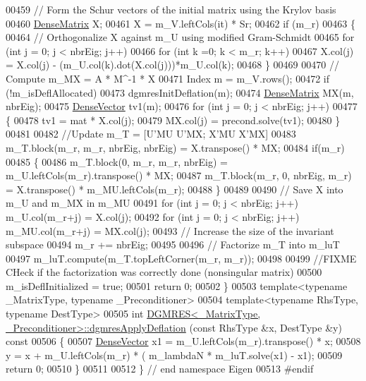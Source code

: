 \begin{DoxyCode}
00459   \textcolor{comment}{// Form the Schur vectors of the initial matrix using the Krylov basis}
00460   \hyperlink{group___core___module}{DenseMatrix} X; 
00461   X = m\_V.leftCols(it) * Sr;
00462   \textcolor{keywordflow}{if} (m\_r)
00463   \{
00464    \textcolor{comment}{// Orthogonalize X against m\_U using modified Gram-Schmidt}
00465    \textcolor{keywordflow}{for} (\textcolor{keywordtype}{int} j = 0; j < nbrEig; j++)
00466      \textcolor{keywordflow}{for} (\textcolor{keywordtype}{int} k =0; k < m\_r; k++)
00467       X.col(j) = X.col(j) - (m\_U.col(k).dot(X.col(j)))*m\_U.col(k); 
00468   \}
00469   
00470   \textcolor{comment}{// Compute m\_MX = A * M^-1 * X}
00471   Index m = m\_V.rows();
00472   \textcolor{keywordflow}{if} (!m\_isDeflAllocated) 
00473     dgmresInitDeflation(m); 
00474   \hyperlink{group___core___module}{DenseMatrix} MX(m, nbrEig);
00475   \hyperlink{group___core___module}{DenseVector} tv1(m);
00476   \textcolor{keywordflow}{for} (\textcolor{keywordtype}{int} j = 0; j < nbrEig; j++)
00477   \{
00478     tv1 = mat * X.col(j);
00479     MX.col(j) = precond.solve(tv1);
00480   \}
00481   
00482   \textcolor{comment}{//Update m\_T = [U'MU U'MX; X'MU X'MX]}
00483   m\_T.block(m\_r, m\_r, nbrEig, nbrEig) = X.transpose() * MX; 
00484   \textcolor{keywordflow}{if}(m\_r)
00485   \{
00486     m\_T.block(0, m\_r, m\_r, nbrEig) = m\_U.leftCols(m\_r).transpose() * MX; 
00487     m\_T.block(m\_r, 0, nbrEig, m\_r) = X.transpose() * m\_MU.leftCols(m\_r);
00488   \}
00489   
00490   \textcolor{comment}{// Save X into m\_U and m\_MX in m\_MU}
00491   \textcolor{keywordflow}{for} (\textcolor{keywordtype}{int} j = 0; j < nbrEig; j++) m\_U.col(m\_r+j) = X.col(j);
00492   \textcolor{keywordflow}{for} (\textcolor{keywordtype}{int} j = 0; j < nbrEig; j++) m\_MU.col(m\_r+j) = MX.col(j);
00493   \textcolor{comment}{// Increase the size of the invariant subspace}
00494   m\_r += nbrEig; 
00495   
00496   \textcolor{comment}{// Factorize m\_T into m\_luT}
00497   m\_luT.compute(m\_T.topLeftCorner(m\_r, m\_r));
00498   
00499   \textcolor{comment}{//FIXME CHeck if the factorization was correctly done (nonsingular matrix)}
00500   m\_isDeflInitialized = \textcolor{keyword}{true};
00501   \textcolor{keywordflow}{return} 0; 
00502 \}
00503 \textcolor{keyword}{template}<\textcolor{keyword}{typename} \_MatrixType, \textcolor{keyword}{typename} \_Preconditioner>
00504 \textcolor{keyword}{template}<\textcolor{keyword}{typename} RhsType, \textcolor{keyword}{typename} DestType>
00505 \textcolor{keywordtype}{int} \hyperlink{class_eigen_1_1_d_g_m_r_e_s}{DGMRES<\_MatrixType, \_Preconditioner>::dgmresApplyDeflation}
      (\textcolor{keyword}{const} RhsType &x, DestType &y)\textcolor{keyword}{ const}
00506 \textcolor{keyword}{}\{
00507   \hyperlink{group___core___module}{DenseVector} x1 = m\_U.leftCols(m\_r).transpose() * x; 
00508   y = x + m\_U.leftCols(m\_r) * ( m\_lambdaN * m\_luT.solve(x1) - x1);
00509   \textcolor{keywordflow}{return} 0; 
00510 \}
00511 
00512 \} \textcolor{comment}{// end namespace Eigen}
00513 \textcolor{preprocessor}{#endif }
\end{DoxyCode}
